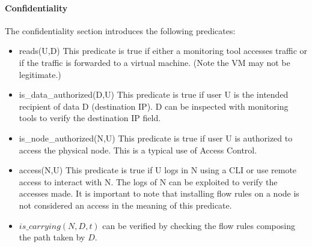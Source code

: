 \paragraph{Confidentiality}
The confidentiality section introduces the following predicates:
\begin{itemize}
\item reads(U,D)
\newline
This predicate is true if either a monitoring tool accesses traffic or if the traffic is forwarded to a virtual machine. (Note the VM may not be legitimate.)

\item is\_data\_authorized(D,U)
\newline
This predicate is true if user U is the intended recipient of data D (\eg destination IP).
D can be inspected with monitoring tools to verify the destination IP field.
\item is\_node\_authorized(N,U)
\newline
This predicate is true if user U is authorized to access the physical node.
This is a typical use of Access Control.
\item access(N,U)
\newline
This predicate is true if U logs in N using a CLI or use remote access to interact with N.
The logs of N can be exploited to verify the accesses made.
It is important to note that installing flow rules on a node is not considered an access in the meaning of this predicate.

\item $is\_carrying(N,D,t)$ can be verified by checking the flow rules composing the path taken by $D$.
\end{itemize}

